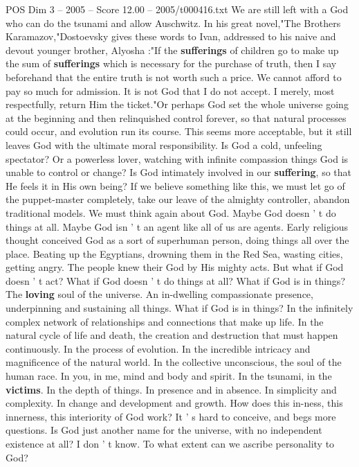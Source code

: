 \begin{textsample}{POS Dim 3 – 2005 – Score 12.00 – 2005/t000416.txt}
We are still left with a God who can do the tsunami and allow Auschwitz.
In his great novel,"The Brothers Karamazov,"Dostoevsky gives these words to Ivan, addressed to his naive and devout younger brother, Alyosha :"If the \textbf{sufferings} of children go to make up the sum of \textbf{sufferings} which is necessary for the purchase of truth, then I say beforehand that the entire truth is not worth such a price.
We cannot afford to pay so much for admission.
It is not God that I do not accept.
I merely, most respectfully, return Him the ticket."Or perhaps God set the whole universe going at the beginning and then relinquished control forever, so that natural processes could occur, and evolution run its course.
This seems more acceptable, but it still leaves God with the ultimate moral responsibility.
Is God a cold, unfeeling spectator?
Or a powerless lover, watching with infinite compassion things God is unable to control or change?
Is God intimately involved in our \textbf{suffering}, so that He feels it in His own being?
If we believe something like this, we must let go of the puppet-master completely, take our leave of the almighty controller, abandon traditional models.
We must think again about God.
Maybe God doesn ' t do things at all.
Maybe God isn ' t an agent like all of us are agents.
Early religious thought conceived God as a sort of superhuman person, doing things all over the place.
Beating up the Egyptians, drowning them in the Red Sea, wasting cities, getting angry.
The people knew their God by His mighty acts.
But what if God doesn ' t act?
What if God doesn ' t do things at all?
What if God is in things?
The \textbf{loving} soul of the universe.
An in-dwelling compassionate presence, underpinning and sustaining all things.
What if God is in things?
In the infinitely complex network of relationships and connections that make up life.
In the natural cycle of life and death, the creation and destruction that must happen continuously.
In the process of evolution.
In the incredible intricacy and magnificence of the natural world.
In the collective unconscious, the soul of the human race.
In you, in me, mind and body and spirit.
In the tsunami, in the \textbf{victims}.
In the depth of things.
In presence and in absence.
In simplicity and complexity.
In change and development and growth.
How does this in-ness, this innerness, this interiority of God work?
It ' s hard to conceive, and begs more questions.
Is God just another name for the universe, with no independent existence at all?
I don ' t know.
To what extent can we ascribe personality to God?

\end{textsample}
